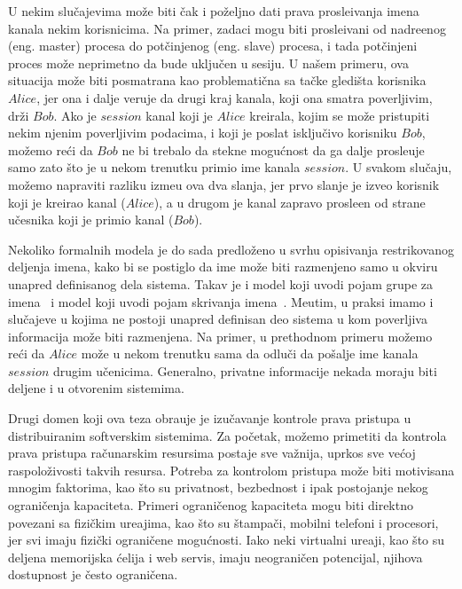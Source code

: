 U nekim slu\v cajevima mo\v ze biti \v cak i po\v zeljno dati prava prosle\dj ivanja imena kanala nekim korisnicima. Na primer, zadaci mogu biti prosle\dj ivani od nadre\dj enog (eng. master) procesa do pot\v cinjenog (eng. slave) procesa, i tada pot\v cinjeni proces mo\v ze neprimetno da bude uklju\v cen u sesiju. U na\v sem primeru, ova situacija mo\v ze biti posmatrana kao problemati\v cna sa ta\v cke gledi\v sta korisnika $\mathit{Alice}$, jer ona i dalje veruje da drugi kraj kanala, koji ona smatra poverljivim, dr\v zi  $\mathit{Bob}$. 
Ako je 
 $\mathit{session}$ kanal koji je $\mathit{Alice}$ kreirala, %
kojim se mo\v ze pristupiti nekim njenim poverljivim podacima, i koji je poslat isklju\v civo korisniku $\mathit{Bob}$, 
mo\v zemo re\' ci da $\mathit{Bob}$ ne bi trebalo da stekne mogu\' cnost da ga dalje prosle\dj uje samo zato \v sto je u nekom trenutku primio ime kanala $\mathit{session}$. U svakom slu\v caju, mo\v zemo napraviti razliku izme\dj u ova dva slanja, jer prvo slanje je izveo korisnik koji je kreirao kanal ($\mathit{Alice}$), a u drugom je kanal zapravo prosle\dj en od strane u\v cesnika koji je primio kanal ($\mathit{Bob}$).

Nekoliko formalnih modela je do sada predlo\v zeno u svrhu opisivanja restrikovanog deljenja imena, kako bi se postiglo da ime mo\v ze biti razmenjeno samo u okviru unapred definisanog dela sistema. Takav je i model koji uvodi pojam grupe za imena~\cite{cardelli05} i model koji uvodi pojam skrivanja imena~\cite{Giunti}. 
Me\dj utim, u praksi imamo i slu\v cajeve u kojima ne postoji unapred definisan deo sistema u kom poverljiva informacija mo\v ze biti razmenjena. Na primer, u prethodnom primeru mo\v zemo re\' ci da $\mathit{Alice}$ mo\v ze u nekom trenutku sama da odlu\v ci da po\v salje ime kanala $\mathit{session}$ drugim u\v cenicima. Generalno, privatne informacije nekada moraju biti deljene i u otvorenim sistemima.




Drugi domen koji ova teza obra\dj uje je izu\v cavanje kontrole prava pristupa u distribuiranim softverskim sistemima. Za po\v cetak, mo\v zemo primetiti da kontrola prava pristupa ra\v cunarskim resursima postaje sve va\v znija, uprkos sve ve\' coj raspolo\v zivosti takvih resursa. Potreba za kontrolom pristupa mo\v ze biti motivisana mnogim faktorima, kao \v sto su privatnost, bezbednost i ipak postojanje nekog ograni\v cenja kapaciteta.
Primeri ograni\v cenog kapaciteta mogu biti direktno povezani sa fizi\v ckim ure\dj ajima, kao \v sto su \v stampa\v ci, mobilni telefoni i procesori, jer svi imaju fizi\v cki ograni\v cene mogu\' cnosti. Iako neki virtualni ure\dj aji, kao \v sto su deljena memorijska \' celija i web servis, imaju neograni\v cen potencijal, njihova dostupnost je \v cesto ograni\v cena.
 
